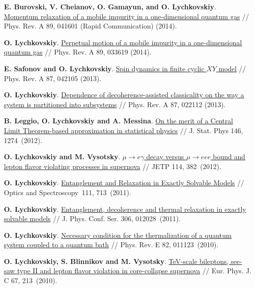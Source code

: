 \documentclass[10pt,a4paper,sans]{moderncv}
\begin{document}
	{\textbf{E. Burovski, V. Cheianov, O. Gamayun, and O. Lychkovskiy}.
	{\textcolor{blue}{\href{http://dx.doi.org/10.1103/PhysRevA.89.041601}{Momentum relaxation of a mobile impurity in a one-dimensional quantum gas}}} //
	Phys. Rev. A 89, 041601 (Rapid Communication) (2014).}

	{\textbf{O. Lychkovskiy}.
	{\textcolor{blue}{\href{http://dx.doi.org/10.1103/PhysRevA.89.033619}{Perpetual motion of a mobile impurity in a one-dimensional quantum gas}}} //
	 Phys. Rev. A 89, 033619 (2014).}

	{\textbf{E. Safonov and O. Lychkovskiy}.
	{\textcolor{blue}{\href{http://dx.doi.org/10.1103/PhysRevA.87.042105}{Spin dynamics in finite cyclic $XY$ model}}} //
	 Phys. Rev. A 87, 042105 (2013).}

	{\textbf{O. Lychkovskiy}.
	{\textcolor{blue}{\href{http://dx.doi.org/10.1103/PhysRevA.87.022112}{Dependence of decoherence-assisted classicality on the way a system is partitioned into subsystems}}} //
	Phys. Rev. A 87, 022112 (2013).}
	
	{\textbf{B. Leggio, O. Lychkovskiy and A. Messina}.
	{\textcolor{blue}{\href{http://dx.doi.org/10.1007/s10955-012-0442-9}{On the merit of a Central Limit Theorem-based approximation in statistical physics}}} //
J. Stat. Phys  146, 1274~(2012).}

	{\textbf{O. Lychkovskiy and M. Vysotsky}.
	{\textcolor{blue}{\href{http://dx.doi.org/10.1134/S1063776112010037}{$\mu \rightarrow e \gamma$ decay versus $\mu \rightarrow e e e$ bound and lepton flavor violating processes in supernova}}} //
JETP  114, 382~(2012).}

	{\textbf{O. Lychkovskiy}.
	{\textcolor{blue}{\href{http://dx.doi.org/10.1134/S0030400X11120186}{Entanglement and Relaxation in Exactly Solvable Models}}} //
Optics and Spectroscopy~111, 713~(2011).}

	{\textbf{O. Lychkovskiy}.
	{\textcolor{blue}{\href{http://dx.doi.org/ 10.1088/1742-6596/306/1/012028}{Entanglement, decoherence and thermal relaxation in exactly solvable models}}} //
J. Phys. Conf. Ser.  306, 012028~(2011).}

	{\textbf{O. Lychkovskiy}.
	{\textcolor{blue}{\href{http://dx.doi.org/10.1103/PhysRevE.82.011123}{Necessary condition for the thermalization of a quantum system coupled to a quantum bath}}} //
Phys. Rev. E 82, 011123~(2010).}


	{\textbf{O. Lychkovskiy, S. Blinnikov and M. Vysotsky}.
	{\textcolor{blue}{\href{http://dx.doi.org/10.1140/epjc/s10052-010-1291-9}{TeV-scale bileptons, see-saw type II and lepton flavor violation in core-collapse supernova}}} //
Eur. Phys. J. C 67, 213~(2010).}
\end{document}
